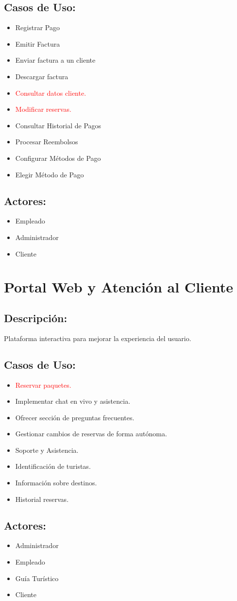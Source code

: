 \subsection*{Casos de Uso:}
\begin{itemize}
    \item Registrar Pago
    \item Emitir Factura
    \item Enviar factura a un cliente
    \item Descargar factura
    \item \textcolor{red}{Consultar datos cliente.}
    \item \textcolor{red}{Modificar reservas.}
    \item Consultar Historial de Pagos
    \item Procesar Reembolsos
    \item Configurar M\'etodos de Pago
    \item Elegir M\'etodo de Pago
\end{itemize}

\subsection*{Actores:}
\begin{itemize}
    \item Empleado
    \item Administrador
    \item Cliente
\end{itemize}

\section{Portal Web y Atenci\'on al Cliente}

\subsection*{Descripci\'on:}
Plataforma interactiva para mejorar la experiencia del usuario.

\subsection*{Casos de Uso:}
\begin{itemize}
    \item \textcolor{red}{Reservar paquetes.}
    \item Implementar chat en vivo y asistencia.
    \item Ofrecer secci\'on de preguntas frecuentes.
    \item Gestionar cambios de reservas de forma aut\'onoma.
    \item Soporte y Asistencia.
    \item Identificación de turistas.
    \item Información sobre destinos.
    \item Historial reservas.
\end{itemize}

\subsection*{Actores:}
\begin{itemize}
    \item Administrador
    \item Empleado
    \item Guía Tur\'istico
    \item Cliente
\end{itemize}
